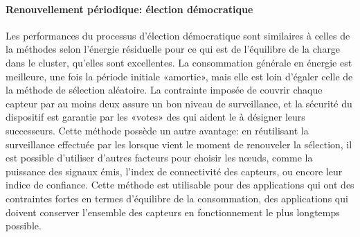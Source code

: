 \paragraph{Renouvellement périodique: élection démocratique}
Les performances du processus d'élection démocratique sont similaires à celles de la méthodes selon l'énergie résiduelle pour ce qui est de l'équilibre de la charge dans le cluster, \cad qu'elles sont excellentes.
La consommation générale en énergie est meilleure, une fois la période initiale «amortie», mais elle est loin d'égaler celle de la méthode de sélection aléatoire.
La contrainte imposée de couvrir chaque capteur par au moins deux \cns assure un bon niveau de surveillance, et la sécurité du dispositif est garantie par les «votes» des \cns qui aident le \ch à désigner leurs successeurs.
Cette méthode possède un autre avantage: en réutilisant la surveillance effectuée par les \cns lorsque vient le moment de renouveler la sélection, il est possible d'utiliser d'autres facteurs pour choisir les nœuds, comme la puissance des signaux émis, l'index de connectivité des capteurs, ou encore leur indice de confiance.
Cette méthode est utilisable pour des applications qui ont des contraintes fortes en termes d'équilibre de la consommation, \cad des applications qui doivent conserver l'ensemble des capteurs en fonctionnement le plus longtemps possible.

